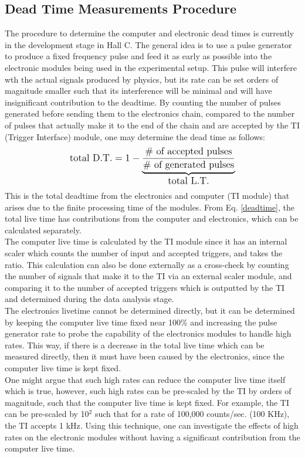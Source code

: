 \documentclass[letterpaper, 12 pt, conference]{ieeeconf}  %
\begin{document}
\subsection{Dead Time Measurements Procedure}
\noindent The procedure to determine the computer and electronic dead times is currently in the development stage in Hall C. The general idea is to use a pulse generator to produce
a fixed frequency pulse and feed it as early as possible into the electronic modules being used in the experimental setup. This pulse will interfere wth the actual signals
produced by physics, but its rate can be set orders of magnitude smaller such that its interference will be minimal and will have insignificant contribution to the deadtime.
By counting the number of pulses generated before sending them to the electronics chain, compared to the number of pulses that actually make it to the end of the chain and
are accepted by the TI (Trigger Interface) module\cite{TI}, one may determine the dead time as follows:
\begin{equation} \label{deadtime}
  \text{total D.T.} = 1 - \underbrace{\frac{\# \text{ of accepted pulses}}{\# \text{ of generated pulses}}}_{\text{\normalsize total L.T.}} 
\end{equation}
This is the total deadtime from the electronics and computer (TI module) that arises due to the finite processing time of the modules. From Eq. \ref{deadtime},  the total live time has contributions from the computer and electronics, which can
be calculated separately. \\
\indent The computer live time is calculated by the TI module since it has an
internal scaler which counts the number of input and accepted triggers, and takes the ratio. This calculation can also be done externally as a cross-check by counting the number of signals that make it to the
TI via an external scaler module, and comparing it to the number of accepted triggers which is outputted by the TI and determined during the data analysis stage. \\
\indent The electronics livetime cannot be determined directly,  but it can be determined by keeping the computer live time fixed near 100$\%$ and
increasing the pulse generator rate to probe the capability of the electronics modules to handle high rates. This way, if there is a decrease in the total live time which can be measured directly, then it must have been caused by the
electronics, since the computer live time is kept fixed. \\
\indent One might argue that such high rates can reduce the computer live time itself which is true, however, such high rates can be pre-scaled by the TI by orders
of magnitude, such that the computer live time is kept fixed. For example, the TI can be pre-scaled by 10$^{2}$ such that for a rate of 100,000 counts/sec. (100 KHz), the TI accepts 1 kHz.  Using this technique, one can investigate the
effects of high rates on the electronic modules without having a significant contribution from the computer live time. \\
\end{document}
